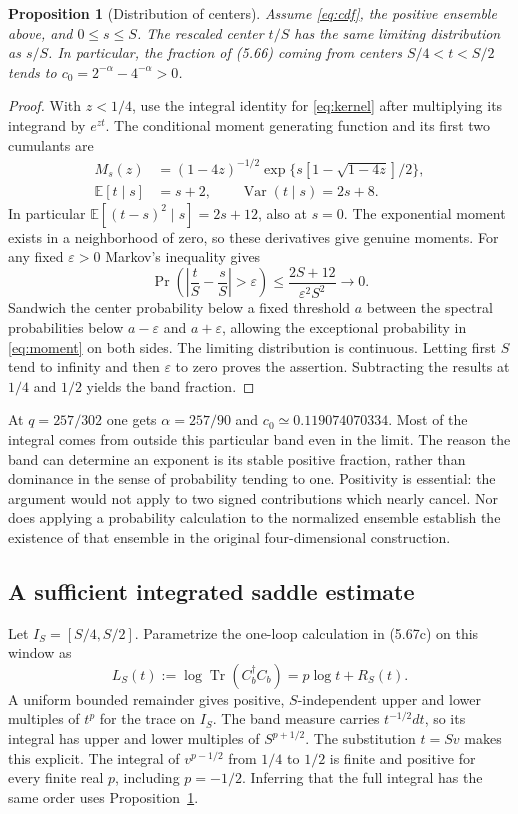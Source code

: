 \documentclass[11pt]{article}
\newcommand{\Tr}{\operatorname{Tr}}
\newcommand{\Prob}{\operatorname{Pr}}
\newcommand{\E}{\mathbb E}
\newcommand{\var}{\operatorname{Var}}
\newtheorem{prop}{Proposition}
\begin{document}
\begin{prop}[Distribution of centers]\label{prop:center}
Assume \eqref{eq:cdf}, the positive ensemble above, and $0\le s\le S$. The rescaled center $t/S$ has the same limiting distribution as $s/S$. In particular, the fraction of (5.66) coming from centers $S/4<t<S/2$ tends to $c_0=2^{-\alpha}-4^{-\alpha}>0$.
\end{prop}
\begin{proof}
With $z<1/4$, use the integral identity for \eqref{eq:kernel} after multiplying its integrand by $e^{zt}$. The conditional moment generating function and its first two cumulants are
\begin{align*}
 M_s(z)&=(1-4z)^{-1/2}
       \exp\{s[1-\sqrt{1-4z}]/2\},\\
 \E[t\mid s]&=s+2,\qquad \var(t\mid s)=2s+8.
\end{align*}
In particular $\E[(t-s)^2\mid s]=2s+12$, also at $s=0$. The exponential moment exists in a neighborhood of zero, so these derivatives give genuine moments. For any fixed $\varepsilon>0$ Markov's inequality gives
\begin{equation}\label{eq:moment}
 \Prob\!\left(\left|\frac{t}{S}-\frac{s}{S}\right|>\varepsilon\right)
 \le \frac{2S+12}{\varepsilon^2 S^2}\longrightarrow0 .
\end{equation}
Sandwich the center probability below a fixed threshold $a$ between the spectral probabilities below $a-\varepsilon$ and $a+\varepsilon$, allowing the exceptional probability in \eqref{eq:moment} on both sides. The limiting distribution is continuous. Letting first $S$ tend to infinity and then $\varepsilon$ to zero proves the assertion. Subtracting the results at $1/4$ and $1/2$ yields the band fraction.
\end{proof}
At $q=257/302$ one gets $\alpha=257/90$ and $c_0\simeq0.119074070334$. Most of the integral comes from outside this particular band even in the limit. The reason the band can determine an exponent is its stable positive fraction, rather than dominance in the sense of probability tending to one. Positivity is essential: the argument would not apply to two signed contributions which nearly cancel. Nor does applying a probability calculation to the normalized ensemble establish the existence of that ensemble in the original four-dimensional construction.

\subsection{A sufficient integrated saddle estimate}
Let $I_S=[S/4,S/2]$. Parametrize the one-loop calculation in (5.67c) on this window as
\[
 L_S(t):=\log\Tr(C_b^\dagger C_b)=p\log t+R_S(t).
\]
A uniform bounded remainder gives positive, $S$-independent upper and lower multiples of $t^p$ for the trace on $I_S$. The band measure carries $t^{-1/2}dt$, so its integral has upper and lower multiples of $S^{p+1/2}$. The substitution $t=Sv$ makes this explicit. The integral of $v^{p-1/2}$ from $1/4$ to $1/2$ is finite and positive for every finite real $p$, including $p=-1/2$. Inferring that the full integral has the same order uses Proposition~\ref{prop:center}.
\end{document}
